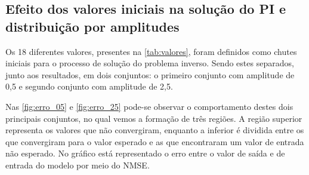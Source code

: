 
\subsection{Efeito dos valores iniciais na solução do PI e distribuição por amplitudes} \label{subsec:estudoi-pi-efeito}
Os 18 diferentes valores, presentes na \autoref{tab:valores}, foram definidos como chutes iniciais para o processo de solução do problema inverso. Sendo estes separados, junto aos resultados, em dois conjuntos: o primeiro conjunto com amplitude de 0,5 e segundo conjunto com amplitude de 2,5.

Nas \autoref{fig:erro_05} e \autoref{fig:erro_25} pode-se observar o comportamento destes dois principais conjuntos, no qual vemos a formação de três regiões. A região superior representa os valores que não convergiram, enquanto a inferior é dividida entre os que convergiram para o valor esperado e as que encontraram um valor de entrada não esperado. No gráfico está representado o erro entre o valor de saída e de entrada do modelo por meio do NMSE.

